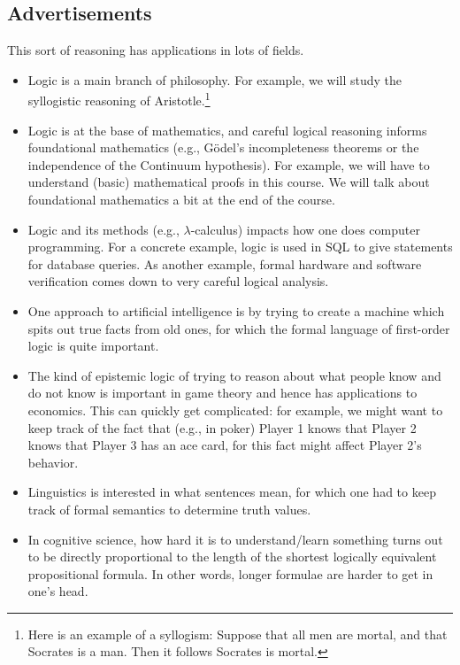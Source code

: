 \documentclass[../notes.tex]{subfiles}
\begin{document}
\subsection{Advertisements}
This sort of reasoning has applications in lots of fields.
\begin{itemize}
	\item Logic is a main branch of philosophy. For example, we will study the syllogistic reasoning of Aristotle.\footnote{Here is an example of a syllogism: Suppose that all men are mortal, and that Socrates is a man. Then it follows Socrates is mortal.}
	\item Logic is at the base of mathematics, and careful logical reasoning informs foundational mathematics (e.g., G\"odel's incompleteness theorems or the independence of the Continuum hypothesis). For example, we will have to understand (basic) mathematical proofs in this course. We will talk about foundational mathematics a bit at the end of the course.
	\item Logic and its methods (e.g., $\lambda$-calculus) impacts how one does computer programming. For a concrete example, logic is used in SQL to give statements for database queries. As another example, formal hardware and software verification comes down to very careful logical analysis.
	\item One approach to artificial intelligence is by trying to create a machine which spits out true facts from old ones, for which the formal language of first-order logic is quite important.
	\item The kind of epistemic logic of trying to reason about what people know and do not know is important in game theory and hence has applications to economics. This can quickly get complicated: for example, we might want to keep track of the fact that (e.g., in poker) Player 1 knows that Player 2 knows that Player 3 has an ace card, for this fact might affect Player 2's behavior.
	\item Linguistics is interested in what sentences mean, for which one had to keep track of formal semantics to determine truth values.
	\item In cognitive science, how hard it is to understand/learn something turns out to be directly proportional to the length of the shortest logically equivalent propositional formula. In other words, longer formulae are harder to get in one's head.
\end{itemize}
\end{document}
